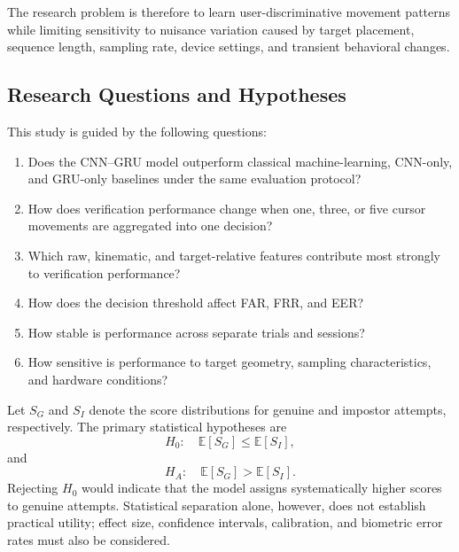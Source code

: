 \documentclass[conference]{IEEEtran}
\begin{document}
The research problem is therefore to learn user-discriminative movement
patterns while limiting sensitivity to nuisance variation caused by target
placement, sequence length, sampling rate, device settings, and transient
behavioral changes.

\subsection{Research Questions and Hypotheses}

This study is guided by the following questions:
\begin{enumerate}
    \item Does the CNN--GRU model outperform classical machine-learning,
    CNN-only, and GRU-only baselines under the same evaluation protocol?

    \item How does verification performance change when one, three, or five
    cursor movements are aggregated into one decision?

    \item Which raw, kinematic, and target-relative features contribute most
    strongly to verification performance?

    \item How does the decision threshold affect FAR, FRR, and EER?

    \item How stable is performance across separate trials and sessions?

    \item How sensitive is performance to target geometry, sampling
    characteristics, and hardware conditions?
\end{enumerate}

Let $S_G$ and $S_I$ denote the score distributions for genuine and impostor
attempts, respectively. The primary statistical hypotheses are
\begin{equation}
H_0:\quad
\mathbb{E}[S_G]
\leq
\mathbb{E}[S_I],
\label{eq:null_hypothesis}
\end{equation}
and
\begin{equation}
H_A:\quad
\mathbb{E}[S_G]
>
\mathbb{E}[S_I].
\label{eq:alternative_hypothesis}
\end{equation}
Rejecting $H_0$ would indicate that the model assigns systematically higher
scores to genuine attempts. Statistical separation alone, however, does not
establish practical utility; effect size, confidence intervals, calibration,
and biometric error rates must also be considered.
\end{document}
